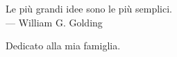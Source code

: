 
\cleardoublepage
{}
\thispagestyle{empty}

\vspace*{3cm}

\begin{center}
Le più grandi idee sono le più semplici.  \\ \medskip
--- William G. Golding   
\end{center}

\medskip

\begin{center}
Dedicato alla mia famiglia.
\end{center}
